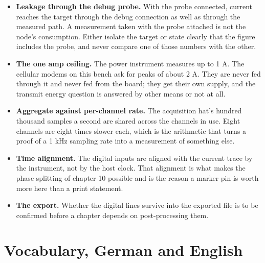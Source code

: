 \begin{itemize}
\item \textbf{Leakage through the debug probe.} With the probe connected, current
reaches the target through the debug connection as well as through the measured
path. A measurement taken with the probe attached is not the node's consumption.
Either isolate the target or state clearly that the figure includes the probe,
and never compare one of those numbers with the other.
\item \textbf{The one amp ceiling.} The power instrument measures up to 1 A. The
cellular modems on this bench ask for peaks of about 2 A. They are never fed
through it and never fed from the board; they get their own supply, and the
transmit energy question is answered by other means or not at all.
\item \textbf{Aggregate against per-channel rate.} The acquisition hat's hundred
thousand samples a second are shared across the channels in use. Eight channels
are eight times slower each, which is the arithmetic that turns a proof of a
1 kHz sampling rate into a measurement of something else.
\item \textbf{Time alignment.} The digital inputs are aligned with the current
trace by the instrument, not by the host clock. That alignment is what makes the
phase splitting of chapter 10 possible and is the reason a marker pin is worth
more here than a print statement.
\item \textbf{The export.} Whether the digital lines survive into the exported
file is to be confirmed before a chapter depends on post-processing them.
\end{itemize}

\section{Vocabulary, German and English}

